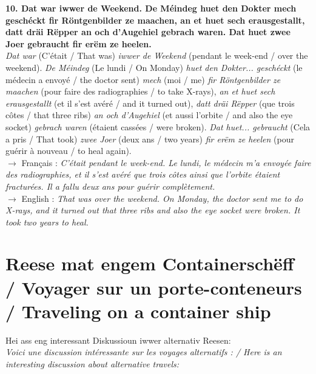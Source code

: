 \noindent\textbf{10. Dat war iwwer de Weekend. De Méindeg huet den Dokter mech geschéckt fir Röntgenbilder ze maachen, an et huet sech erausgestallt, datt dräi Rëpper an och d'Augehiel gebrach waren. Dat huet zwee Joer gebraucht fir erëm ze heelen.}\\
\textit{Dat war} (C'était / That was) \textit{iwwer de Weekend} (pendant le week-end / over the weekend). \textit{De Méindeg} (Le lundi / On Monday) \textit{huet den Dokter... geschéckt} (le médecin a envoyé / the doctor sent) \textit{mech} (moi / me) \textit{fir Röntgenbilder ze maachen} (pour faire des radiographies / to take X-rays), \textit{an et huet sech erausgestallt} (et il s'est avéré / and it turned out), \textit{datt dräi Rëpper} (que trois côtes / that three ribs) \textit{an och d'Augehiel} (et aussi l'orbite / and also the eye socket) \textit{gebrach waren} (étaient cassées / were broken). \textit{Dat huet... gebraucht} (Cela a pris / That took) \textit{zwee Joer} (deux ans / two years) \textit{fir erëm ze heelen} (pour guérir à nouveau / to heal again).\\
$\rightarrow$ Français : \textit{C'était pendant le week-end. Le lundi, le médecin m'a envoyée faire des radiographies, et il s'est avéré que trois côtes ainsi que l'orbite étaient fracturées. Il a fallu deux ans pour guérir complètement.}\\
$\rightarrow$ English : \textit{That was over the weekend. On Monday, the doctor sent me to do X-rays, and it turned out that three ribs and also the eye socket were broken. It took two years to heal.}

\vspace{1cm}

\section[Reese mat engem Containerschëff / Voyage / Travel]{Reese mat engem Containerschëff \\/ Voyager sur un porte-conteneurs \\/ Traveling on a container ship}

Hei ass eng interessant Diskussioun iwwer alternativ Reesen: \\
\textit{Voici une discussion intéressante sur les voyages alternatifs : / Here is an interesting discussion about alternative travels:}

